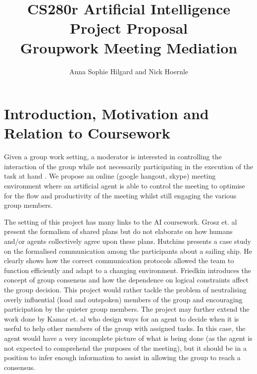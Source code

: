 \documentclass[11pt]{article}
\title{CS280r Artificial Intelligence Project Proposal \\ \Large{Groupwork Meeting Mediation}}
\author{Anna Sophie Hilgard and Nick Hoernle}
\begin{document}
\maketitle{}
\setlength{\parindent}{2em}
\setlength{\parskip}{1em}
\renewcommand{\baselinestretch}{1.3}


\section{Introduction, Motivation and Relation to Coursework}
Given a group work setting, a moderator is interested in controlling the interaction of the group while not necessarily participating in the execution of the task at hand \cite{short2015towards}. We propose an online (google hangout, skype) meeting environment where an artificial agent is able to control the meeting to optimise for the flow and productivity of the meeting whilst still engaging the various group members.

The setting of this project has many links to the AI coursework. Grosz et. al present the formalism of shared plans but do not elaborate on how humans and/or agents collectively agree upon these plans. Hutchins presents a case study on the formalised communication among the participants about a sailing ship. He clearly shows how the correct communication protocols allowed the team to function efficiently and adapt to a changing environment. Friedkin introduces the concept of group consensus and how the dependence on logical constraints affect the group decision. This project would rather tackle the problem of neutralising overly influential (load and outspoken) members of the group and encouraging participation by the quieter group members. The project may further extend the work done by Kamar et. al who design ways for an agent to decide when it is useful to help other members of the group with assigned tasks. In this case, the agent would have a very incomplete picture of what is being done (as the agent is not expected to comprehend the purposes of the meeting), but it should be in a position to infer enough information to assist in allowing the group to reach a consensus.




\end{document}
